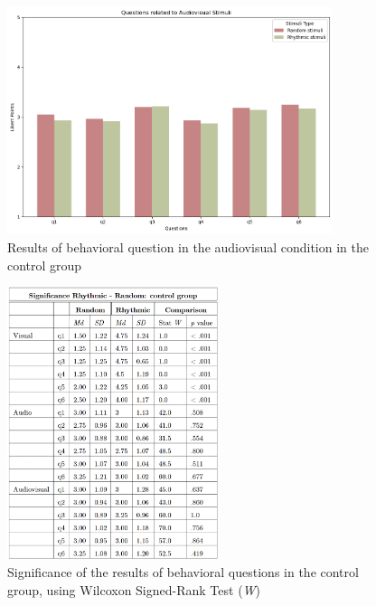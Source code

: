 \begin{figure}[H]
    \centering
    \includegraphics[width=0.85\textwidth]{bar_plots/bar_audiovisual_h.png}
    \caption{Results of behavioral question in the audiovisual condition in the control group}
    \label{fig: bar_audiovisual_control} 
\end{figure} 
\begin{figure}[H]
    \centering
    \includegraphics[width=0.55\textwidth]{significance_tables/control_group.png}
    \caption{Significance of the results of behavioral questions in the control group, using Wilcoxon Signed-Rank Test (\textit{W})}
    \label{fig: significance_control_pop} 
\end{figure} 

